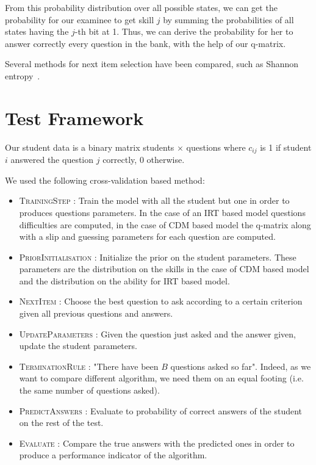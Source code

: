 \documentclass{sig-alternate}
\begin{document}
From this probability distribution over all possible states, we can get the probability for our examinee to get skill $j$ by summing the probabilities of all states having the $j$-th bit at 1. Thus, we can derive the probability for her to answer correctly every question in the bank, with the help of our q-matrix.

Several methods for next item selection have been compared, such as Shannon entropy~\citep{Xu2003}. %


\section{Test Framework}

Our student data is a binary matrix students $\times$ questions where $c_{ij}$ is 1 if student $i$ answered the question $j$ correctly, 0 otherwise. 

We used the following cross-validation based method: 

\begin{itemize}
\item \textsc{TrainingStep} : Train the model with all the student but one in order to produces questions parameters. In the case of an IRT based model questions difficulties are computed, in the case of CDM based model the q-matrix along with a slip and guessing parameters for each question are computed. 
\item \textsc{PriorInitialisation} : Initialize the prior on the student parameters.  These parameters are the distribution on the skills in the case of CDM based model and the distribution on the ability for IRT based model. 
\item \textsc{NextItem} : Choose the best question to ask according to a certain criterion given all previous questions and answers. 
\item \textsc{UpdateParameters} : Given the question just asked and the answer given, update the student parameters.
\item \textsc{TerminationRule} : "There have been $B$ questions asked so far". Indeed, as we want to compare different algorithm, we need them on an equal footing (i.e. the same number of questions asked). 
\item \textsc{PredictAnswers} : Evaluate to probability of correct answers of the student on the rest of the test.
\item \textsc{Evaluate} : Compare the true answers with the predicted ones in order to produce a performance indicator of the algorithm. 
\end{itemize}
\end{document}
